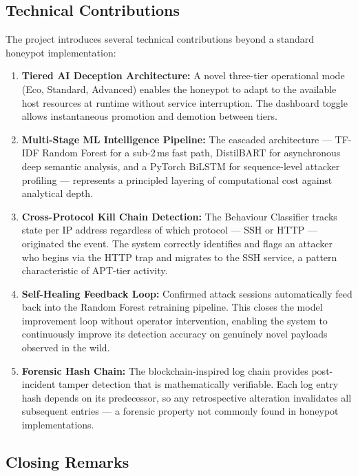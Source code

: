 \subsection{Technical Contributions}

The project introduces several technical contributions beyond a standard honeypot implementation:

\begin{enumerate}
    \item \textbf{Tiered AI Deception Architecture:} A novel three-tier operational mode (Eco, Standard, Advanced) enables the honeypot to adapt to the available host resources at runtime without service interruption. The dashboard toggle allows instantaneous promotion and demotion between tiers.

    \item \textbf{Multi-Stage ML Intelligence Pipeline:} The cascaded architecture — TF-IDF Random Forest for a sub-2\,ms fast path, DistilBART for asynchronous deep semantic analysis, and a PyTorch BiLSTM for sequence-level attacker profiling — represents a principled layering of computational cost against analytical depth.

    \item \textbf{Cross-Protocol Kill Chain Detection:} The Behaviour Classifier tracks state per IP address regardless of which protocol — SSH or HTTP — originated the event. The system correctly identifies and flags an attacker who begins via the HTTP trap and migrates to the SSH service, a pattern characteristic of \ac{APT}-tier activity.

    \item \textbf{Self-Healing Feedback Loop:} Confirmed attack sessions automatically feed back into the Random Forest retraining pipeline. This closes the model improvement loop without operator intervention, enabling the system to continuously improve its detection accuracy on genuinely novel payloads observed in the wild.

    \item \textbf{Forensic Hash Chain:} The blockchain-inspired log chain provides post-incident tamper detection that is mathematically verifiable. Each log entry hash depends on its predecessor, so any retrospective alteration invalidates all subsequent entries — a forensic property not commonly found in honeypot implementations.
\end{enumerate}

\subsection{Closing Remarks}

